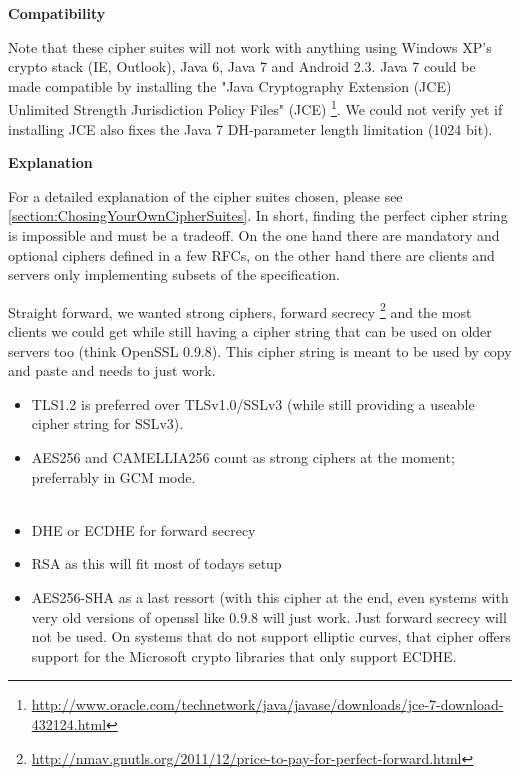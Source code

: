 \textbf{Compatibility}

Note that these cipher suites will not work with anything using Windows XP's
crypto stack (IE, Outlook), Java 6, Java 7 and Android 2.3. Java 7 could be
made compatible by installing the "Java Cryptography Extension (JCE) Unlimited
Strength Jurisdiction Policy Files"
(JCE) \footnote{\url{http://www.oracle.com/technetwork/java/javase/downloads/jce-7-download-432124.html}}.
We could not verify yet if installing JCE also fixes the Java 7
DH-parameter length limitation (1024 bit). 

\textbf{Explanation}

For a detailed explanation of the cipher suites chosen, please see
\ref{section:ChosingYourOwnCipherSuites}. In short, finding the perfect cipher
string is impossible and must be a tradeoff. On the one hand
there are mandatory and optional ciphers defined in a few RFCs, on the other hand
there are clients and servers only implementing subsets of the specification.

Straight forward, we wanted strong ciphers, forward secrecy
\footnote{\url{http://nmav.gnutls.org/2011/12/price-to-pay-for-perfect-forward.html}}
and the most clients we could get while still having a cipher string that can be
used on older servers too (think OpenSSL 0.9.8). This cipher string is meant to be used
by copy and paste and needs to just work.

\begin{itemize}
\item TLS1.2 is preferred over TLSv1.0/SSLv3 (while still providing a useable cipher
      string for SSLv3).
\item AES256 and CAMELLIA256 count as strong ciphers at the moment; preferrably in
      GCM mode.\\
       \\
\item DHE or ECDHE for forward secrecy
\item RSA as this will fit most of todays setup
\item AES256-SHA as a last ressort (with this cipher at the end, even systems with
      very old versions of openssl like 0.9.8 will just work. Just forward secrecy
      will not be used. On systems that do not support elliptic curves, that cipher
      offers support for the Microsoft crypto libraries that only support ECDHE.
\end{itemize}




